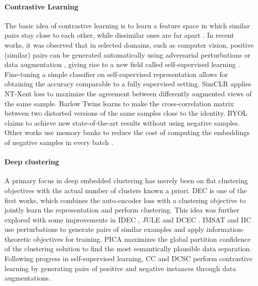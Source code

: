 \documentclass[runningheads]{llncs}
\begin{document}
\paragraph{Contrastive Learning} The basic idea of contrastive learning is to learn a feature space in which similar pairs stay close to each other, while dissimilar ones are far apart \cite{chopra2005learning}. In recent works, it was observed that in selected domains, such as computer vision, positive (similar) pairs can be generated automatically using adversarial perturbations \cite{miyato2018virtual} or data augmentation \cite{Moco_2020}, giving rise to a new field called self-supervised learning \cite{simclr}. Fine-tuning a simple classifier 
on self-supervised representation allows for obtaining the accuracy comparable to a fully supervised setting.
SimCLR \cite{Moco_2020} applies NT-Xent loss to maximize the agreement between differently augmented views of the same sample. Barlow Twins \cite{zbontar2021barlow} learns to make the cross-correlation matrix between two distorted versions of the same samples close to the identity. BYOL \cite{grill2020bootstrap} claims to achieve new state-of-the-art results without using negative samples. Other works use memory banks to reduce the cost of computing the embeddings of negative samples in every batch \cite{wu2018unsupervised,Moco_2020}.













\paragraph{Deep clustering} A primary focus in deep embedded clustering has merely been on flat clustering objectives with the actual number of clusters known a priori. DEC \cite{xie2016unsupervised} is one of the first works, which combines the auto-encoder loss with a clustering objective to jointly learn the representation and perform clustering. This idea was further explored with some improvements in IDEC \cite{guo2017improved}, JULE \cite{yang2016joint} and DCEC \cite{guo2017deep}. IMSAT \cite{hu2017learning} and IIC \cite{ji2019invariant} use perturbations to generate pairs of similar examples and apply information-theoretic objectives for training. PICA \cite{huang2020deep} maximizes the global partition confidence of the clustering solution to find the most semantically plausible data separation. Following progress in self-supervised learning, CC \cite{li2021contrastive} and DCSC \cite{Zhang2022} perform contrastive learning by generating pairs of positive and negative instances through data augmentations. 
\end{document}
